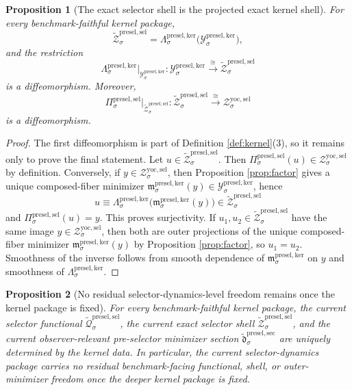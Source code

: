 \documentclass[11pt]{article}
\newcommand{\YoctoSelectorShell}[1]{\mathcal Z_{#1}^{\mathrm{yoc,sel}}}
\newcommand{\PreSectionSelectorProj}[1]{\Pi_{#1}^{\mathrm{presel,sel}}}
\newcommand{\KernelProj}[1]{\Lambda_{#1}^{\mathrm{presel,ker}}}
\newcommand{\KernelComposedMin}[1]{\mathfrak m_{#1}^{\mathrm{presel,ker}}}
\newcommand{\KernelShell}[1]{\mathcal Y_{#1}^{\mathrm{presel,ker}}}
\newcommand{\InducedSelectorFunctional}[1]{\widetilde{\mathscr Q}_{#1}^{\mathrm{presel,sel}}}
\newcommand{\InducedSelectorShell}[1]{\widetilde{\mathcal Z}_{#1}^{\mathrm{presel,sel}}}
\newcommand{\InducedPreSelectorMinSection}[1]{\widetilde{\mathfrak d}_{#1}^{\mathrm{presel,sec}}}
\newtheorem{proposition}{Proposition}
\begin{document}
\begin{proposition}[The exact selector shell is the projected exact kernel shell]
\label{prop:shell}
For every benchmark-faithful kernel package,
\[
\InducedSelectorShell{\sigma}
=
\KernelProj{\sigma}\bigl(\KernelShell{\sigma}\bigr),
\]
and the restriction
\[
\KernelProj{\sigma}\big|_{\KernelShell{\sigma}}
:
\KernelShell{\sigma}\xrightarrow{\cong}\InducedSelectorShell{\sigma}
\]
is a diffeomorphism. Moreover,
\[
\PreSectionSelectorProj{\sigma}\big|_{\InducedSelectorShell{\sigma}}
:
\InducedSelectorShell{\sigma}\xrightarrow{\cong}\YoctoSelectorShell{\sigma}
\]
is a diffeomorphism.
\end{proposition}

\begin{proof}
The first diffeomorphism is part of Definition \ref{def:kernel}(3), so it remains only to prove the final statement. Let \(u\in\InducedSelectorShell{\sigma}\). Then \(\PreSectionSelectorProj{\sigma}(u)\in\YoctoSelectorShell{\sigma}\) by definition. Conversely, if \(y\in\YoctoSelectorShell{\sigma}\), then Proposition \ref{prop:factor} gives a unique composed-fiber minimizer \(\KernelComposedMin{\sigma}(y)\in\KernelShell{\sigma}\), hence
\[
u\equiv\KernelProj{\sigma}\bigl(\KernelComposedMin{\sigma}(y)\bigr)\in\InducedSelectorShell{\sigma}
\]
and \(\PreSectionSelectorProj{\sigma}(u)=y\). This proves surjectivity. If \(u_1,u_2\in\InducedSelectorShell{\sigma}\) have the same image \(y\in\YoctoSelectorShell{\sigma}\), then both are outer projections of the unique composed-fiber minimizer \(\KernelComposedMin{\sigma}(y)\) by Proposition \ref{prop:factor}, so \(u_1=u_2\). Smoothness of the inverse follows from smooth dependence of \(\KernelComposedMin{\sigma}\) on \(y\) and smoothness of \(\KernelProj{\sigma}\).
\end{proof}

\begin{proposition}[No residual selector-dynamics-level freedom remains once the kernel package is fixed]
\label{prop:nofreedom}
For every benchmark-faithful kernel package, the current selector functional \(\InducedSelectorFunctional{\sigma}\), the current exact selector shell \(\InducedSelectorShell{\sigma}\), and the current observer-relevant pre-selector minimizer section \(\InducedPreSelectorMinSection{\sigma}\) are uniquely determined by the kernel data. In particular, the current selector-dynamics package carries no residual benchmark-facing functional, shell, or outer-minimizer freedom once the deeper kernel package is fixed.
\end{proposition}
\end{document}
